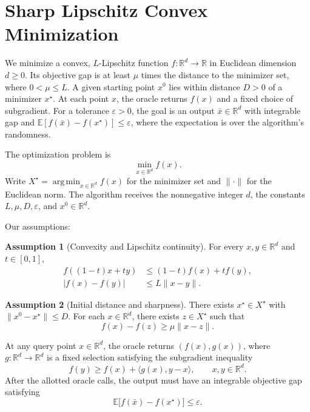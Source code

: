 \documentclass[10pt]{article}
\theoremstyle{definition}
\newtheorem{assumption}{Assumption}
\begin{document}
\section*{Sharp Lipschitz Convex Minimization}
We minimize a convex, $L$-Lipschitz function $f:\mathbb{R}^d\to\mathbb{R}$ in Euclidean dimension $d\geq 0$. Its objective gap is at least $\mu$ times the distance to the minimizer set, where $0<\mu\leq L$. A given starting point $x^0$ lies within distance $D>0$ of a minimizer $x^\star$. At each point $x$, the oracle returns $f(x)$ and a fixed choice of subgradient. For a tolerance $\varepsilon>0$, the goal is an output $\bar{x}\in\mathbb{R}^d$ with integrable gap and $\mathbb{E}[f(\bar{x})-f(x^\star)]\leq\varepsilon$, where the expectation is over the algorithm's randomness.

The optimization problem is
\[
\min_{x\in\mathbb{R}^d} f(x).
\]
Write $X^\star=\operatorname*{arg\,min}_{x\in\mathbb{R}^d} f(x)$ for the minimizer set and $\|\cdot\|$ for the Euclidean norm. The algorithm receives the nonnegative integer $d$, the constants $L,\mu,D,\varepsilon$, and $x^0\in\mathbb{R}^d$.

Our assumptions:
\begin{assumption}[Convexity and Lipschitz continuity]
For every $x,y\in\mathbb{R}^d$ and $t\in[0,1]$,
\[
\begin{aligned}
f((1-t)x+ty)&\leq (1-t)f(x)+t f(y),\\
|f(x)-f(y)|&\leq L\|x-y\|.
\end{aligned}
\]
\end{assumption}

\begin{assumption}[Initial distance and sharpness]
There exists $x^\star\in X^\star$ with $\|x^0-x^\star\|\leq D$. For each $x\in\mathbb{R}^d$, there exists $z\in X^\star$ such that
\[
f(x)-f(z)\geq\mu\|x-z\|.
\]
\end{assumption}

At any query point $x\in\mathbb{R}^d$, the oracle returns $(f(x),g(x))$, where $g:\mathbb{R}^d\to\mathbb{R}^d$ is a fixed selection satisfying the subgradient inequality
\[
f(y)\geq f(x)+\langle g(x),y-x\rangle,
\qquad x,y\in\mathbb{R}^d.
\]
After the allotted oracle calls, the output must have an integrable objective gap satisfying
\[
\mathbb{E}\bigl[f(\bar{x})-f(x^\star)\bigr]\leq\varepsilon.
\]
\end{document}
